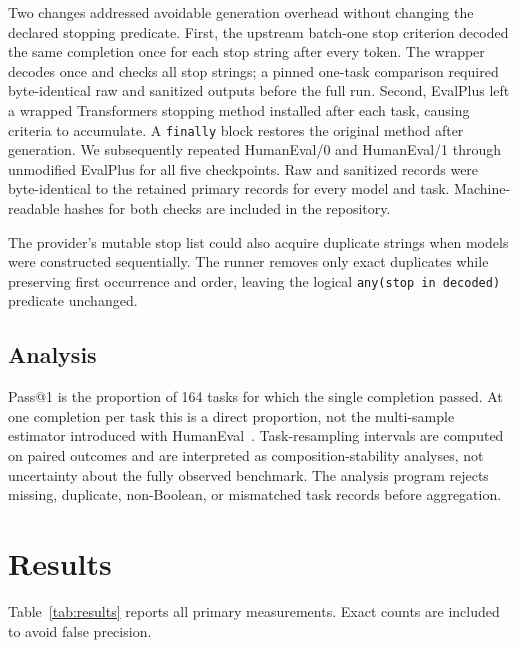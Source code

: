 \documentclass[10pt,twocolumn]{article}
\newcommand{\code}[1]{\texttt{#1}}
\begin{document}
Two changes addressed avoidable generation overhead without changing the declared stopping predicate. First, the upstream batch-one stop criterion decoded the same completion once for each stop string after every token. The wrapper decodes once and checks all stop strings; a pinned one-task comparison required byte-identical raw and sanitized outputs before the full run. Second, EvalPlus left a wrapped Transformers stopping method installed after each task, causing criteria to accumulate. A \code{finally} block restores the original method after generation. We subsequently repeated HumanEval/0 and HumanEval/1 through unmodified EvalPlus for all five checkpoints. Raw and sanitized records were byte-identical to the retained primary records for every model and task. Machine-readable hashes for both checks are included in the repository.

The provider's mutable stop list could also acquire duplicate strings when models were constructed sequentially. The runner removes only exact duplicates while preserving first occurrence and order, leaving the logical \code{any(stop in decoded)} predicate unchanged.

\subsection{Analysis}

Pass@1 is the proportion of 164 tasks for which the single completion passed. At one completion per task this is a direct proportion, not the multi-sample estimator introduced with HumanEval~\citep{chen2021humaneval}. Task-resampling intervals are computed on paired outcomes and are interpreted as composition-stability analyses, not uncertainty about the fully observed benchmark. The analysis program rejects missing, duplicate, non-Boolean, or mismatched task records before aggregation.

\section{Results}

Table~\ref{tab:results} reports all primary measurements. Exact counts are included to avoid false precision.
\end{document}
